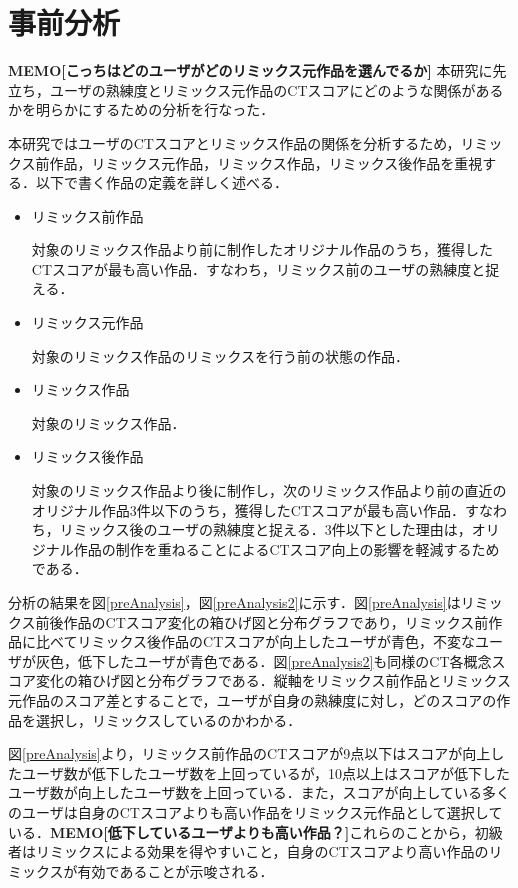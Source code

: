 \documentclass[submit,techrep,noauthor]{ipsj}
\newcommand{\memo}[1]{\colorbox{magenta!30}{\textbf{MEMO}}{\color{red!50}\textbf{[#1]}}}
\begin{document}
\section{事前分析}
\label{sec:preAnalysis}
\memo{こっちはどのユーザがどのリミックス元作品を選んでるか}
本研究に先立ち，ユーザの熟練度とリミックス元作品のCTスコアにどのような関係があるかを明らかにするための分析を行なった．

本研究ではユーザのCTスコアとリミックス作品の関係を分析するため，リミックス前作品，リミックス元作品，リミックス作品，リミックス後作品を重視する．以下で書く作品の定義を詳しく述べる．

\begin{itemize}
    \item リミックス前作品
    
    対象のリミックス作品より前に制作したオリジナル作品のうち，獲得したCTスコアが最も高い作品．すなわち，リミックス前のユーザの熟練度と捉える．
    
    \item リミックス元作品

    対象のリミックス作品のリミックスを行う前の状態の作品．
    
    \item リミックス作品

    対象のリミックス作品．
    
    \item リミックス後作品

    対象のリミックス作品より後に制作し，次のリミックス作品より前の直近のオリジナル作品3件以下のうち，獲得したCTスコアが最も高い作品．すなわち，リミックス後のユーザの熟練度と捉える．3件以下とした理由は，オリジナル作品の制作を重ねることによるCTスコア向上の影響を軽減するためである．
    
\end{itemize}


分析の結果を図\ref{preAnalysis}，図\ref{preAnalysis2}に示す．図\ref{preAnalysis}はリミックス前後作品のCTスコア変化の箱ひげ図と分布グラフであり，リミックス前作品に比べてリミックス後作品のCTスコアが向上したユーザが青色，不変なユーザが灰色，低下したユーザが青色である．図\ref{preAnalysis2}も同様のCT各概念スコア変化の箱ひげ図と分布グラフである．縦軸をリミックス前作品とリミックス元作品のスコア差とすることで，ユーザが自身の熟練度に対し，どのスコアの作品を選択し，リミックスしているのかわかる．

図\ref{preAnalysis}より，リミックス前作品のCTスコアが9点以下はスコアが向上したユーザ数が低下したユーザ数を上回っているが，10点以上はスコアが低下したユーザ数が向上したユーザ数を上回っている．また，スコアが向上している多くのユーザは自身のCTスコアよりも高い作品をリミックス元作品として選択している．\memo{低下しているユーザよりも高い作品？}これらのことから，初級者はリミックスによる効果を得やすいこと，自身のCTスコアより高い作品のリミックスが有効であることが示唆される．
\end{document}
